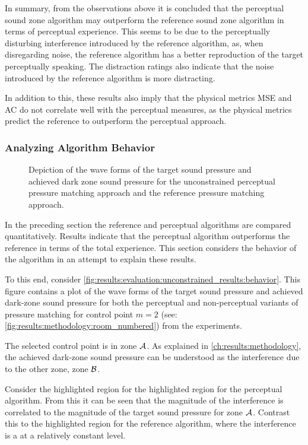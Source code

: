 In summary, from the observations above it is concluded that the perceptual sound zone algorithm may
outperform the reference sound zone algorithm in terms of perceptual experience.
This seems to be due to the perceptually disturbing interference introduced by the reference algorithm,
as, when disregarding noise, the reference algorithm has a better reproduction of the target perceptually speaking.
The distraction ratings also indicate that the noise introduced by the reference algorithm is more distracting.

In addition to this, these results also imply that the physical metrics MSE and AC do not correlate well 
with the perceptual measures, as the physical metrics predict the reference to outperform the perceptual approach.

\subsubsection*{Analyzing Algorithm Behavior}
\begin{figure}[]
    \centering
    
    \caption{Depiction of the wave forms of the target sound pressure and achieved dark zone sound pressure for the 
        unconstrained perceptual pressure matching approach and the reference pressure matching approach.}
        \label{fig:results:evaluation:unconstrained_results:behavior}
\end{figure}

In the preceding section the reference and perceptual algorithms are compared quantitatively.
Results indicate that the perceptual algorithm outperforms the reference in terms of the total experience.
This section considers the behavior of the algorithm in an attempt to explain these results.

To this end, consider \autoref{fig:results:evaluation:unconstrained_results:behavior}.
This figure contains a plot of the wave forms of the target sound pressure and achieved dark-zone sound pressure 
for both the perceptual and non-perceptual variants of pressure matching for control point $m=2$ 
(see: \autoref{fig:results:methodology:room_numbered}) from the experiments.

The selected control point is in zone $\mathcal{A}$. 
As explained in \autoref{ch:results:methodology}, the achieved dark-zone sound pressure can be understood 
as the interference due to the other zone, zone $\mathcal{B}$.

Consider the highlighted region for the highlighted region for the perceptual algorithm.
From this it can be seen that the 
magnitude of the interference is correlated to the magnitude of the target sound pressure for zone $\mathcal{A}$.
Contrast this to the highlighted region for the reference algorithm, where the interference is a 
at a relatively constant level.

